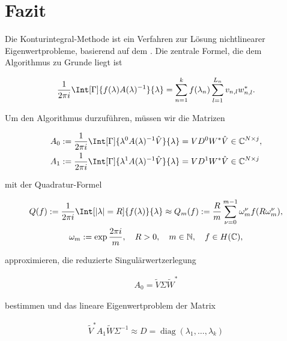 \chapter{Fazit}

Die Konturintegral-Methode ist ein Verfahren zur Lösung nichtlinearer Eigenwertprobleme, basierend auf dem .
Die zentrale Formel, die dem Algorithmus zu Grunde liegt ist

\begin{gather*}
    \frac{1}{2 \pi i}
    \Int[\Gamma]{f(\lambda) A(\lambda)^{-1}}{\lambda}
    =
    \sum_{n=1}^k
        f(\lambda_n)
        \sum_{l=1}^{L_n}
            v_{n, l} w_{n, l}^\ast.
\end{gather*}

Um den Algorithmus durzuführen, müssen wir die Matrizen

\begin{align*}
    A_0
    & :=
    \frac{1}{2 \pi i}
    \Int[\Gamma]{\lambda^0 A(\lambda)^{-1} \hat V}{\lambda}
    =
    V D^0 W^\ast \hat V
    \in
    \C^{N \times j}, \\
    A_1
    & :=
    \frac{1}{2 \pi i}
    \Int[\Gamma]{\lambda^1 A(\lambda)^{-1} \hat V}{\lambda}
    =
    V D^1 W^\ast \hat V
    \in
    \C^{N \times j}
\end{align*}

mit der Quadratur-Formel

\begin{gather*}
    Q(f)
    :=
    \frac{1}{2 \pi i}
    \Int[|\lambda| = R]{f(\lambda)}{\lambda}
    \approx
    Q_m(f)
    :=
    \frac{R}{m}
    \sum_{\nu = 0}^{m-1}
        \omega_m^\nu f(R \omega_m^\nu), \\
    \omega_m
    :=
    \exp \frac{2 \pi i}{m},
    \quad
    R > 0,
    \quad
    m \in \N,
    \quad
    f \in H(\C),
\end{gather*}

approximieren, die reduzierte Singulärwertzerlegung

\begin{align*}
    A_0
    =
    \tilde V \Sigma \tilde W^\ast
\end{align*}

bestimmen und das lineare Eigenwertproblem der Matrix

\begin{align*}
    \tilde V^\ast A_1 \tilde W \Sigma^{-1}
    \approx
    D
    =
    \operatorname{diag}(\lambda_1, \dots, \lambda_k)
\end{align*}

